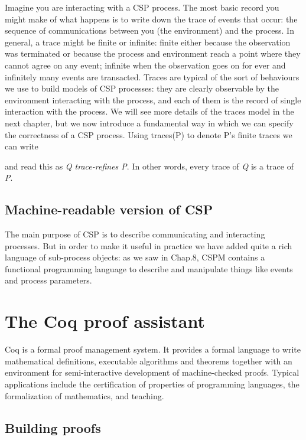 Imagine you are interacting with a CSP process. The most basic record you might make of what happens is to write down the trace of events that occur: the sequence of communications between you (the environment) and the process. In general, a trace might be finite or infinite: finite either because the observation was terminated or because the process and environment reach a point where they cannot agree on any event; infinite when the observation goes on for ever and infinitely many events are transacted. Traces are typical of the sort of behaviours we use to build models of CSP processes: they are clearly observable by the environment interacting with the process, and each of them is the record of single interaction with the process. We will see more details of the traces model in the next chapter, but we now introduce a fundamental way in which we can specify the correctness of a CSP process. Using traces(P) to denote P’s finite traces we can write

and read this as \emph{Q trace-refines P}. In other words, every trace of \emph{Q} is a trace of \emph{P}.

\subsection{Machine-readable version of CSP}

The main purpose of CSP is to describe communicating and interacting processes. But in order to make it useful in practice we have added quite a rich language of sub-process objects: as we saw in Chap.8, CSPM contains a functional programming language to describe and manipulate things like events and process parameters.

\section{The Coq proof assistant}

Coq is a formal proof management system. It provides a formal language to write mathematical definitions, executable algorithms and theorems together with an environment for semi-interactive development of machine-checked proofs. Typical applications include the certification of properties of programming languages, the formalization of mathematics, and teaching. 

\subsection{Building proofs}

